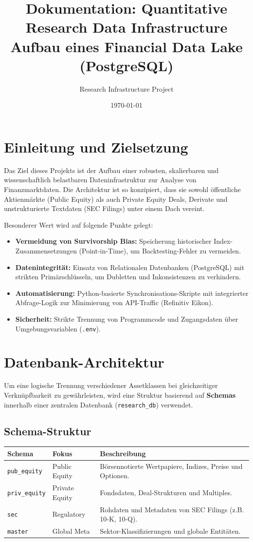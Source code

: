 \documentclass[12pt,a4paper]{article}
\title{Dokumentation: Quantitative Research Data Infrastructure \\ \large Aufbau eines Financial Data Lake (PostgreSQL)}
\author{Research Infrastructure Project}
\date{\today}
\begin{document}
\maketitle

\section{Einleitung und Zielsetzung}
Das Ziel dieses Projekts ist der Aufbau einer robusten, skalierbaren und wissenschaftlich belastbaren Dateninfrastruktur zur Analyse von Finanzmarktdaten. Die Architektur ist so konzipiert, dass sie sowohl öffentliche Aktienmärkte (Public Equity) als auch Private Equity Deals, Derivate und unstrukturierte Textdaten (SEC Filings) unter einem Dach vereint.

Besonderer Wert wird auf folgende Punkte gelegt:
\begin{itemize}
    \item \textbf{Vermeidung von Survivorship Bias:} Speicherung historischer Index-Zusammensetzungen (Point-in-Time), um Backtesting-Fehler zu vermeiden.
    \item \textbf{Datenintegrität:} Einsatz von Relationalen Datenbanken (PostgreSQL) mit strikten Primärschlüsseln, um Dubletten und Inkonsistenzen zu verhindern.
    \item \textbf{Automatisierung:} Python-basierte Synchronisations-Skripte mit integrierter Abfrage-Logik zur Minimierung von API-Traffic (Refinitiv Eikon).
    \item \textbf{Sicherheit:} Strikte Trennung von Programmcode und Zugangsdaten über Umgebungsvariablen (\texttt{.env}).
\end{itemize}

\section{Datenbank-Architektur}
Um eine logische Trennung verschiedener Assetklassen bei gleichzeitiger Verknüpfbarkeit zu gewährleisten, wird eine Struktur basierend auf \textbf{Schemas} innerhalb einer zentralen Datenbank (\texttt{research\_db}) verwendet.

\subsection{Schema-Struktur}
\begin{table}[h]
\centering
\begin{tabular}{@{}llp{8cm}@{}}
\toprule
\textbf{Schema} & \textbf{Fokus} & \textbf{Beschreibung} \\ \midrule
\texttt{pub\_equity} & Public Equity & Börsennotierte Wertpapiere, Indizes, Preise und Optionen. \\
\texttt{priv\_equity} & Private Equity & Fondsdaten, Deal-Strukturen und Multiples. \\
\texttt{sec} & Regulatory & Rohdaten und Metadaten von SEC Filings (z.B. 10-K, 10-Q). \\
\texttt{master} & Global Meta & Sektor-Klassifizierungen und globale Entitäten. \\ \bottomrule
\end{tabular}
\end{table}
\end{document}
